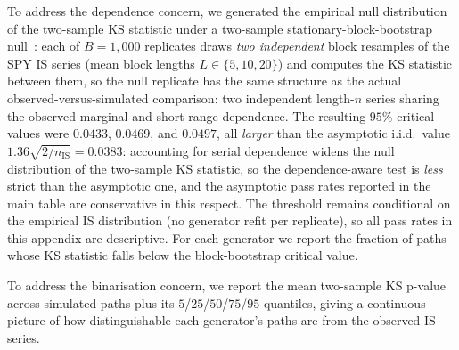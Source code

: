 To address the dependence concern, we generated the empirical null distribution of the two-sample KS statistic under a two-sample stationary-block-bootstrap null~\citep{politis1994stationary}: each of $B = 1{,}000$ replicates draws \emph{two independent} block resamples of the SPY IS series (mean block lengths $L \in \{5, 10, 20\}$) and computes the KS statistic between them, so the null replicate has the same structure as the actual observed-versus-simulated comparison: two independent length-$n$ series sharing the observed marginal and short-range dependence. The resulting $95\%$ critical values were $0.0433$, $0.0469$, and $0.0497$, all \emph{larger} than the asymptotic i.i.d.\ value $1.36 \sqrt{2/n_{\text{IS}}} = 0.0383$: accounting for serial dependence widens the null distribution of the two-sample KS statistic, so the dependence-aware test is \emph{less} strict than the asymptotic one, and the asymptotic pass rates reported in the main table are conservative in this respect. The threshold remains conditional on the empirical IS distribution (no generator refit per replicate), so all pass rates in this appendix are descriptive. For each generator we report the fraction of paths whose KS statistic falls below the block-bootstrap critical value.

To address the binarisation concern, we report the mean two-sample KS p-value across simulated paths plus its $5$/$25$/$50$/$75$/$95$ quantiles, giving a continuous picture of how distinguishable each generator's paths are from the observed IS series.

